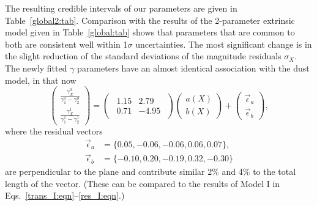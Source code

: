 \documentclass{aastex61}   	%
\begin{document}
The resulting credible intervals of our parameters are given in Table~\ref{global2:tab}.  Comparison with the
results of the 2-parameter extrinsic model given in Table~\ref{global:tab} shows that  parameters that are common to both
are consistent well within 1$\sigma$ uncertainties.  The most significant change is in the slight reduction of the standard
deviations of the magnitude residuals $\sigma_X$.
The newly fitted $\gamma$ parameters have an almost identical association with the   dust model, in that now
\begin{equation}
\begin{pmatrix}
 \frac{\gamma^0_X}{\gamma^0_1-\gamma^0_2} \\
\frac{\gamma^1_X}{\gamma^1_1-\gamma^1_2} 
\end{pmatrix}=
\begin{pmatrix}
\begin{array}{rr}
1.15 & 2.79 \\
0.71 & -4.95
\end{array}
\end{pmatrix} 
\begin{pmatrix}
a(X) \\
b(X)
\end{pmatrix}+
\begin{pmatrix}
\vec{\epsilon}_a \\
\vec{\epsilon}_b
\end{pmatrix},
\end{equation}
where the residual vectors 
\begin{align}
\vec{\epsilon}_a &=\{0.05, -0.06, -0.06,  0.06,  0.07\},\\
\vec{\epsilon}_b &=\{ -0.10, 0.20,  -0.19,  0.32, -0.30\}
\end{align}
\label{model11trans:eqn}
are perpendicular to the   plane and
contribute similar 2\% and 4\% to the total  length of the vector.
(These can be compared to the results of Model I in Eqs.\ \ref{trans_I:eqn}--\ref{res_I:eqn}.)
\end{document}
